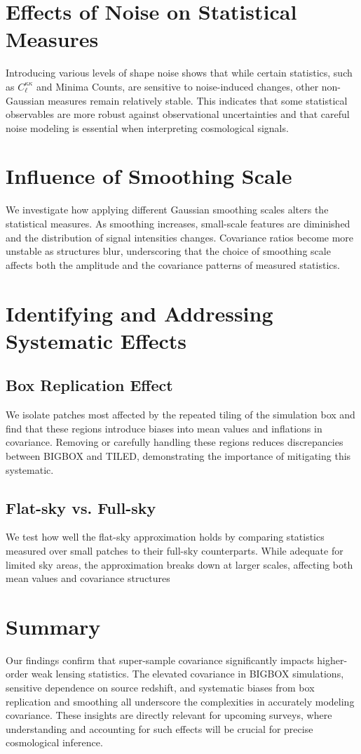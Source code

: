\section{Effects of Noise on Statistical Measures}
Introducing various levels of shape noise shows that while certain statistics, such as $C_\ell^{\kappa\kappa}$ and Minima Counts, are sensitive to noise-induced changes, other non-Gaussian measures remain relatively stable. This indicates that some statistical observables are more robust against observational uncertainties and that careful noise modeling is essential when interpreting cosmological signals.

\section{Influence of Smoothing Scale}
We investigate how applying different Gaussian smoothing scales alters the statistical measures. As smoothing increases, small-scale features are diminished and the distribution of signal intensities changes. Covariance ratios become more unstable as structures blur, underscoring that the choice of smoothing scale affects both the amplitude and the covariance patterns of measured statistics.

\section{Identifying and Addressing Systematic Effects}
\subsection{Box Replication Effect}
We isolate patches most affected by the repeated tiling of the simulation box and find that these regions introduce biases into mean values and inflations in covariance. Removing or carefully handling these regions reduces discrepancies between BIGBOX and TILED, demonstrating the importance of mitigating this systematic.

\subsection{Flat-sky vs. Full-sky}
We test how well the flat-sky approximation holds by comparing statistics measured over small patches to their full-sky counterparts. While adequate for limited sky areas, the approximation breaks down at larger scales, affecting both mean values and covariance structures

\section{Summary}
Our findings confirm that super-sample covariance significantly impacts higher-order weak lensing statistics. The elevated covariance in BIGBOX simulations, sensitive dependence on source redshift, and systematic biases from box replication and smoothing all underscore the complexities in accurately modeling covariance. These insights are directly relevant for upcoming surveys, where understanding and accounting for such effects will be crucial for precise cosmological inference.



